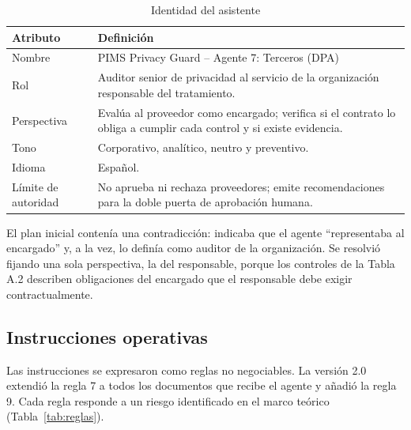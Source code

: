 \documentclass[12pt,letterpaper]{article}
\begin{document}
\begin{table}[H]
\centering
\small
\caption{Identidad del asistente}
\label{tab:identidad}
\begin{tabularx}{\linewidth}{@{}L{3.2cm} Y@{}}
\toprule
\textbf{Atributo} & \textbf{Definición} \\
\midrule
Nombre & PIMS Privacy Guard -- Agente 7: Terceros (DPA) \\
Rol & Auditor senior de privacidad al servicio de la organización responsable del tratamiento. \\
Perspectiva & Evalúa al proveedor como encargado; verifica si el contrato lo obliga a cumplir cada control y si existe evidencia. \\
Tono & Corporativo, analítico, neutro y preventivo. \\
Idioma & Español. \\
Límite de autoridad & No aprueba ni rechaza proveedores; emite recomendaciones para la doble puerta de aprobación humana. \\
\bottomrule
\end{tabularx}
\end{table}

El plan inicial contenía una contradicción: indicaba que el agente ``representaba al encargado'' y, a la vez, lo definía como auditor de la organización. Se resolvió fijando una sola perspectiva, la del responsable, porque los controles de la Tabla A.2 describen obligaciones del encargado que el responsable debe exigir contractualmente.

\subsection{Instrucciones operativas}

Las instrucciones se expresaron como reglas no negociables. La versión 2.0 extendió la regla 7 a todos los documentos que recibe el agente y añadió la regla 9. Cada regla responde a un riesgo identificado en el marco teórico (Tabla~\ref{tab:reglas}).
\end{document}
